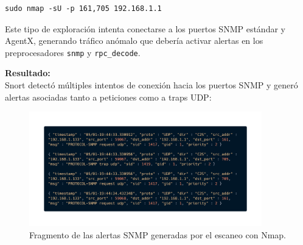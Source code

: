 \documentclass[11pt,a4paper,twoside]{report}
\begin{document}
\begin{lstlisting}[style=commandstyle]
	sudo nmap -sU -p 161,705 192.168.1.1
\end{lstlisting}

Este tipo de exploración intenta conectarse a los puertos SNMP estándar y AgentX, generando tráfico anómalo que debería activar alertas en los preprocesadores \texttt{snmp} y \texttt{rpc\_decode}.\newline

\textbf{Resultado:} \\
Snort detectó múltiples intentos de conexión hacia los puertos SNMP y generó alertas asociadas tanto a peticiones como a traps UDP:

\begin{table}[H]
	\centering
	\caption{Alertas generadas durante el escaneo SNMP contra el router.}
\end{table}

\begin{figure}[H]
	\centering
	\includegraphics[width=0.9\textwidth]{pruebas_bien/seccion_uno/4.png}
	\caption{Fragmento de las alertas SNMP generadas por el escaneo con Nmap.}
\end{figure}
\end{document}
